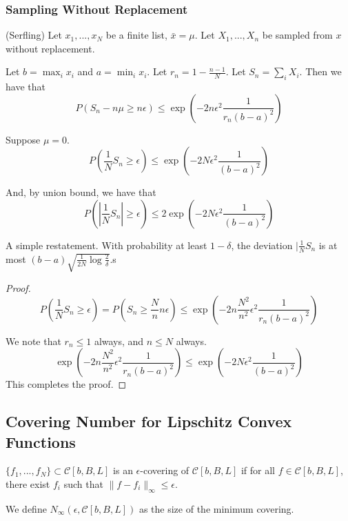 \documentclass{article}
\begin{document}
\subsubsection{Sampling Without Replacement}


\begin{lemma} (Serfling) 
Let $x_1,..., x_N$ be a finite list, $\bar{x} = \mu$. Let $X_1,...,X_n$ be sampled from $x$ without replacement. 

Let $b = \max_i x_i$ and $a = \min_i x_i$. Let $r_n = 1- \frac{n-1}{N}$. Let $S_n = \sum_i X_i$.
Then we have that
\[
P( S_n - n \mu \geq n \epsilon) \leq \exp( - 2 n \epsilon^2 \frac{1}{r_n (b-a)^2})
\]
\end{lemma}

\begin{corollary}
Suppose $\mu = 0$. 
\[
P( \frac{1}{N} S_n \geq \epsilon) \leq \exp( -2 N \epsilon^2 \frac{1}{(b-a)^2})
\]

And, by union bound, we have that
\[
P( | \frac{1}{N} S_n| \geq \epsilon) \leq 2 \exp( -2 N \epsilon^2 \frac{1}{(b-a)^2})
\]

\end{corollary}

A simple restatement. With probability at least $1- \delta$, the deviation $| \frac{1}{N} S_n$ is at most $ (b-a) \sqrt{ \frac{1}{2N} \log \frac{2}{\delta}}$.s

\begin{proof}
\[
P( \frac{1}{N} S_n \geq \epsilon) = P( S_n \geq \frac{N}{n} n \epsilon) \leq \exp( - 2 n \frac{N^2}{n^2} \epsilon^2 \frac{1}{r_n (b-a)^2} ) 
\]

We note that $r_n \leq 1$ always, and $n \leq N$ always. 
\[
\exp( - 2 n \frac{N^2}{n^2} \epsilon^2 \frac{1}{r_n (b-a)^2} )  \leq \exp( - 2 N \epsilon^2 \frac{1}{(b-a)^2})
\]
This completes the proof.

\end{proof}

\subsection{Covering Number for Lipschitz Convex Functions}

\begin{definition}
$\{ f_1,..., f_N\} \subset \mathcal{C}[b,B,L]$ is an $\epsilon$-covering of $\mathcal{C}[b,B,L]$ if for all $f \in \mathcal{C}[b,B,L]$, there exist $f_i$ such that $\| f - f_i \|_\infty \leq \epsilon$.

We define $N_\infty( \epsilon, \mathcal{C}[b,B,L])$ as the size of the minimum covering.
\end{definition}
\end{document}
